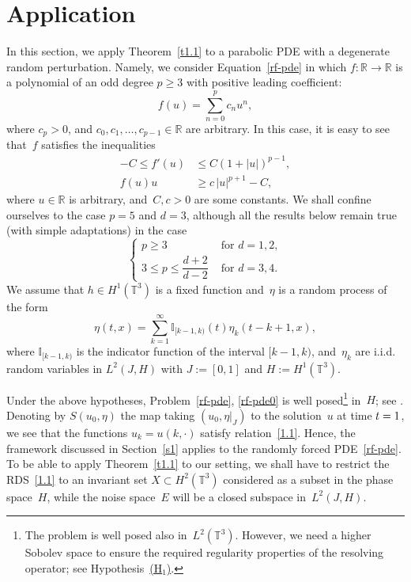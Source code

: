 \documentclass[JEP,XML,SOM,Unicode,ThmDefs]{cedram}
\theoremstyle{plain}
\numberwithin{equation}{section}
\newcommand{\R}{{\mathbb R}}
\newcommand{\I}{{\mathbb I}}
\newcommand{\T}{{\mathbb T}}
\begin{document}
\section{Application}
\label{s4}
In this section, we apply Theorem~\ref{t1.1} to a parabolic PDE with a degenerate random perturbation. Namely, we consider Equation~\eqref{rf-pde} in which $f:\R\to\R$ is a polynomial of an odd degree $p\ge3$ with positive leading coefficient:
\begin{equation} \label{nonlinear-term}
f(u)=\sum_{n=0}^p c_n u^n,
\end{equation}
where $c_p>0$, and $c_0, c_1, \ldots, c_{p-1}\in \R$ are arbitrary. In this case, it is easy to see that~$f$ satisfies the inequalities
\begin{align}
-C\le f'(u)&\le C(1+|u|)^{p-1},\label{E:4.1}\\
f(u)u&\ge c\,|u|^{p+1}-C,\label{E:4.2}
\end{align}
where $u\in\R$ is arbitrary, and~$C,c>0$ are some constants. We shall confine ourselves to the case $p=5$ and $d=3$, although all the results below remain true (with simple adaptations) in the case
\begin{equation}\label{power-dimension}
\begin{cases}p\ge3 & \text{ for } d=1,2,\\ 3\le p\le\dfrac{d+2}{d-2} & \text{ for } d=3,4. \end{cases}
\end{equation}
We assume that $h\in H^1(\T^3)$ is a fixed function and~$\eta$ is a random process of the form%
\begin{equation} \label{E:4.3}
\eta(t,x)=\sum_{k=1}^\infty \I_{[k-1,k)}(t)\eta_k(t-k+1,x),
\end{equation}
where $\I_{[k-1,k)}$ is the indicator function of the interval $[k-1,k)$, and~$\eta_k$ are i.i.d. random variables in $L^2(J,H)$ with $J:=[0,1]$ and $H:=H^1(\T^3)$.

Under the above hypotheses, Problem~\eqref{rf-pde}, \eqref{rf-pde0} is well posed\footnote{The problem is well posed also in~$L^2(\T^3)$. However, we need a higher Sobolev space to ensure the required regularity properties of the resolving operator; see Hypothesis~\hyperlink{H1}{(H$_1$)}.} in~$H$; see \cite[Chap.\,I,\,\S5]{BV1992}. Denoting by $S(u_0,\eta)$ the map taking $(u_0,\eta|_J)$ to the solution~$u$ at time $t=\nobreak1$, we see that the functions $u_k=u(k,\cdot)$ satisfy relation~\eqref{1.1}. Hence, the framework discussed in Section~\ref{s1} applies to the randomly forced PDE~\eqref{rf-pde}. To be able to apply Theorem~\ref{t1.1} to our setting, we shall have to restrict the RDS~\eqref{1.1} to an invariant set $X\subset H^2(\T^3)$ considered as a subset in the phase space~$H$, while the noise space~$E$ will be a closed subspace in~$L^2(J,H)$.
\end{document}

